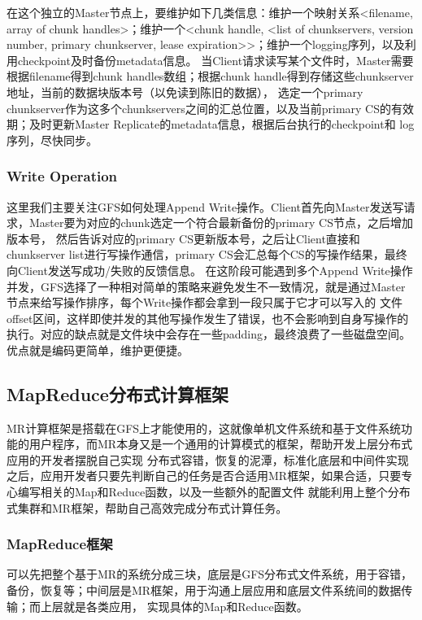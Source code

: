 \documentclass[UTF8]{article}
\begin{document}
在这个独立的Master节点上，要维护如下几类信息：维护一个映射关系<filename, array of chunk handles>；维护一个<chunk handle, <list of chunkservers, 
version number, primary chunkserver, lease expiration>>；维护一个logging序列，以及利用checkpoint及时备份metadata信息。
当Client请求读写某个文件时，Master需要根据filename得到chunk handles数组；根据chunk handle得到存储这些chunkserver地址，当前的数据块版本号（以免读到陈旧的数据），
选定一个primary chunkserver作为这多个chunkservers之间的汇总位置，以及当前primary CS的有效期；及时更新Master Replicate的metadata信息，根据后台执行的checkpoint和
log序列，尽快同步。

\subsubsection{Write Operation}
这里我们主要关注GFS如何处理Append Write操作。Client首先向Master发送写请求，Master要为对应的chunk选定一个符合最新备份的primary CS节点，之后增加版本号，
然后告诉对应的primary CS更新版本号，之后让Client直接和chunkserver list进行写操作通信，primary CS会汇总每个CS的写操作结果，最终向Client发送写成功/失败的反馈信息。
在这阶段可能遇到多个Append Write操作并发，GFS选择了一种相对简单的策略来避免发生不一致情况，就是通过Master节点来给写操作排序，每个Write操作都会拿到一段只属于它才可以写入的
文件offset区间，这样即使并发的其他写操作发生了错误，也不会影响到自身写操作的执行。对应的缺点就是文件块中会存在一些padding，最终浪费了一些磁盘空间。
优点就是编码更简单，维护更便捷。


\subsection{MapReduce分布式计算框架}
MR计算框架是搭载在GFS上才能使用的，这就像单机文件系统和基于文件系统功能的用户程序，而MR本身又是一个通用的计算模式的框架，帮助开发上层分布式应用的开发者摆脱自己实现
分布式容错，恢复的泥潭，标准化底层和中间件实现之后，应用开发者只要先判断自己的任务是否合适用MR框架，如果合适，只要专心编写相关的Map和Reduce函数，以及一些额外的配置文件
就能利用上整个分布式集群和MR框架，帮助自己高效完成分布式计算任务。

\subsubsection{MapReduce框架}
可以先把整个基于MR的系统分成三块，底层是GFS分布式文件系统，用于容错，备份，恢复等；中间层是MR框架，用于沟通上层应用和底层文件系统间的数据传输；而上层就是各类应用，
实现具体的Map和Reduce函数。
\end{document}
